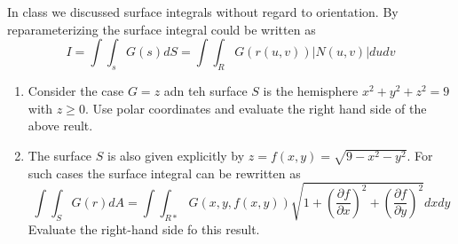 In class we discussed surface integrals without regard to orientation. By reparameterizing the surface integral could be written as 
\begin{equation*}
I=\int \int_s G\left(s\right)dS=\int \int_R G\left(r\left(u,v\right)\right)\vert N\left(u,v\right)\vert dudv
\end{equation*}

\begin{enumerate}
	\item Consider the case $G=z$ adn teh surface $S$ is the hemisphere $x^2+y^2+z^2=9$ with $z\geq0$. Use polar coordinates and evaluate the right hand side of the above reult. 
	\item The surface $S$ is also given explicitly by $z=f\left(x,y\right)=\sqrt{9-x^2-y^2}$. For such cases the surface integral can be rewritten as 
	\begin{equation}
		\int \int_S G\left(r\right)dA=\int \int_{R*} G(x,y,f(x,y))\sqrt{1+\left(\frac{\partial f}{\partial x}\right)^2+\left(\frac{\partial f}{\partial y}\right)^2}dxdy
		\end{equation}
		Evaluate the right-hand side fo this result.
		
\end{enumerate}